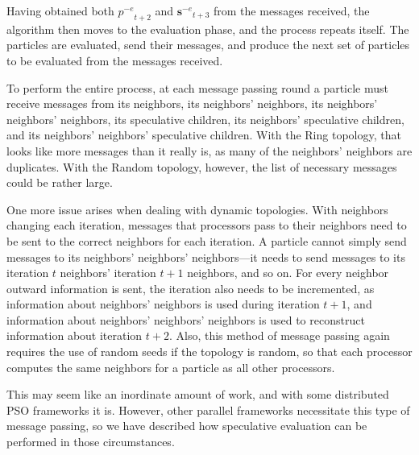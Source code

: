 \documentclass[smallcondensed]{svjour3}
\providecommand{\noeval}[1]{\ensuremath{#1^{-e}}}
\providecommand{\p}{\ensuremath{p}}
\providecommand{\sset}{\ensuremath{\mathbf{s}}}
\begin{document}
Having obtained both $\noeval{\p}_{t+2}$ and $\noeval{\sset}_{t+3}$ from the
messages received, the algorithm then moves to the evaluation phase, and the
process repeats itself.  The particles are evaluated, send their messages, and
produce the next set of particles to be evaluated from the messages received.

To perform the entire process, at each message passing round a particle must
receive messages from its neighbors, its neighbors' neighbors, its neighbors'
neighbors' neighbors, its speculative children, its neighbors' speculative
children, and its neighbors' neighbors' speculative children.  With the Ring
topology, that looks like more messages than it really is, as many of the
neighbors' neighbors are duplicates.  With the Random topology, however, the
list of necessary messages could be rather large.  

One more issue arises when dealing with dynamic topologies.  With neighbors
changing each iteration, messages that processors pass to their neighbors need
to be sent to the correct neighbors for each iteration.  A particle cannot
simply send messages to its neighbors' neighbors' neighbors---it needs to send
messages to its iteration $t$ neighbors' iteration $t+1$ neighbors, and so on.
For every neighbor outward information is sent, the iteration also needs to be
incremented, as information about neighbors' neighbors is used during iteration
$t+1$, and information about neighbors' neighbors' neighbors is used to
reconstruct information about iteration $t+2$.  Also, this method of message
passing again requires the use of random seeds if the topology is random, so
that each processor computes the same neighbors for a particle as all other
processors.

This may seem like an inordinate amount of work, and with some distributed PSO
frameworks it is.  However, other parallel frameworks necessitate this type of
message passing, so we have described how speculative evaluation can be
performed in those circumstances.




\end{document}

